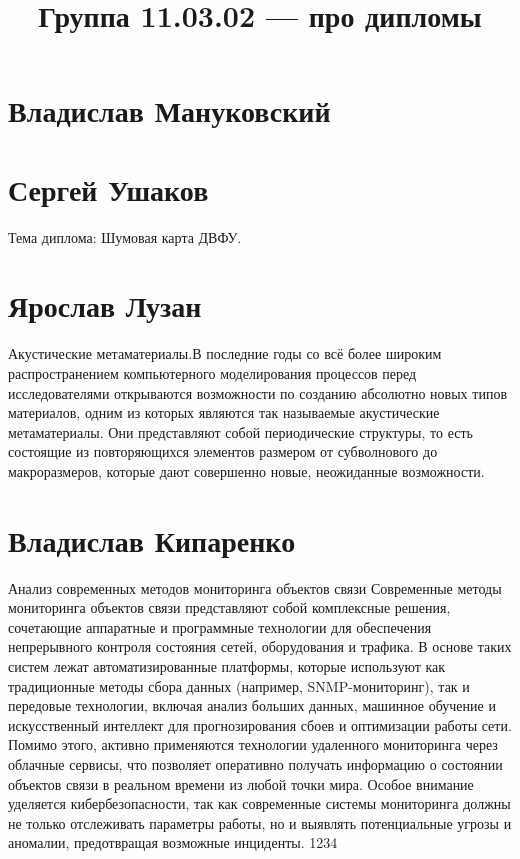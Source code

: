 \documentclass{article}
\title{Группа 11.03.02 --- про дипломы}
\begin{document}
\section*{Владислав Мануковский}

\section*{Сергей Ушаков}
Тема диплома: Шумовая карта ДВФУ.

\section*{Ярослав Лузан}
Акустические метаматериалы.В последние годы со всё более широким распространением компьютерного моделирования процессов перед исследователями открываются возможности по созданию абсолютно новых типов материалов, одним из которых являются так называемые акустические метаматериалы. Они представляют собой периодические структуры, то есть состоящие из повторяющихся элементов размером от субволнового до макроразмеров, которые дают совершенно новые, неожиданные возможности.

\section*{Владислав Кипаренко}
Анализ современных методов мониторинга объектов связи
Современные методы мониторинга объектов связи представляют собой комплексные решения, сочетающие аппаратные и программные технологии для обеспечения непрерывного контроля состояния сетей, оборудования и трафика. В основе таких систем лежат автоматизированные платформы, которые используют как традиционные методы сбора данных (например, SNMP-мониторинг), так и передовые технологии, включая анализ больших данных, машинное обучение и искусственный интеллект для прогнозирования сбоев и оптимизации работы сети. Помимо этого, активно применяются технологии удаленного мониторинга через облачные сервисы, что позволяет оперативно получать информацию о состоянии объектов связи в реальном времени из любой точки мира. Особое внимание уделяется кибербезопасности, так как современные системы мониторинга должны не только отслеживать параметры работы, но и выявлять потенциальные угрозы и аномалии, предотвращая возможные инциденты.
1234
\end{document}

